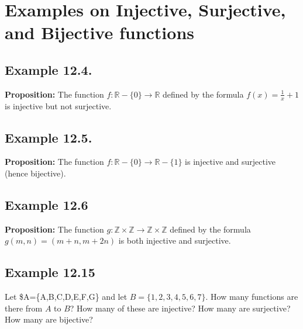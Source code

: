 \documentclass[
]{article}
\author{}
\date{}
\begin{document}
\hypertarget{examples-on-injective-surjective-and-bijective-functions}{%
\section{Examples on Injective, Surjective, and Bijective
functions}\label{examples-on-injective-surjective-and-bijective-functions}}

\hypertarget{example-12.4.}{%
\subsection{Example 12.4.}\label{example-12.4.}}

\textbf{Proposition:} The function \(f:\mathbb{R}-\{0\}\to\mathbb{R}\)
defined by the formula \(f(x)=\frac{1}{x}+1\) is injective but not
surjective.

\vfill\eject

\hypertarget{example-12.5.}{%
\subsection{Example 12.5.}\label{example-12.5.}}

\textbf{Proposition:} The function
\(f:\mathbb{R}-\{0\}\to\mathbb{R}-\{1\}\) is injective and surjective
(hence bijective).

\vfill\eject

\hypertarget{example-12.6}{%
\subsection{Example 12.6}\label{example-12.6}}

\textbf{Proposition:} The function
\(g:\mathbb{Z}\times\mathbb{Z}\to\mathbb{Z}\times\mathbb{Z}\) defined by
the formula \(g(m,n) = (m+n,m+2n)\) is both injective and surjective.

\vfill\eject

\hypertarget{example-12.15}{%
\subsection{Example 12.15}\label{example-12.15}}

Let \$A=\{A,B,C,D,E,F,G\} and let \(B=\{1,2,3,4,5,6,7\}\). How many
functions are there from \(A\) to \(B\)? How many of these are
injective? How many are surjective? How many are bijective?
\end{document}
